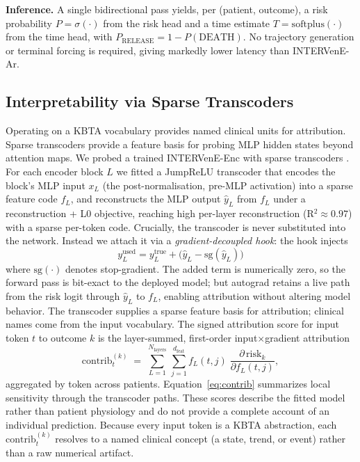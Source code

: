 \documentclass[letterpaper]{article} %
\begin{document}
\textbf{Inference.} A single bidirectional pass yields, per (patient, outcome), a risk probability $P = \sigma(\cdot)$ from the risk head and a time estimate $T = \mathrm{softplus}(\cdot)$ from the time head, with $P_{\text{RELEASE}} = 1 - P(\text{DEATH})$. No trajectory generation or terminal forcing is required, giving markedly lower latency than INTERVenE-Ar.

\subsection{Interpretability via Sparse Transcoders}

Operating on a KBTA vocabulary provides named clinical units for attribution. Sparse transcoders provide a feature basis for probing MLP hidden states beyond attention maps. We probed a trained INTERVenE-Enc with sparse transcoders \citep{dunefsky2024transcoders}. For each encoder block $L$ we fitted a JumpReLU transcoder \citep{rajamanoharan2024jumping} that encodes the block's MLP input $x_L$ (the post-normalisation, pre-MLP activation) into a sparse feature code $f_L$, and reconstructs the MLP output $\hat{y}_L$ from $f_L$ under a reconstruction + L0 objective, reaching high per-layer reconstruction (R$^2\approx 0.97$) with a sparse per-token code. Crucially, the transcoder is never substituted into the network. Instead we attach it via a \emph{gradient-decoupled hook}: the hook injects
\begin{equation}
y^{\mathrm{used}}_L = y^{\mathrm{true}}_L + \big(\hat{y}_L - \mathrm{sg}(\hat{y}_L)\big)
\label{eq:gd-hook}
\end{equation}
where $\mathrm{sg}(\cdot)$ denotes stop-gradient. The added term is numerically zero, so the forward pass is bit-exact to the deployed model; but autograd retains a live path from the risk logit through $\hat{y}_L$ to $f_L$, enabling attribution without altering model behavior. The transcoder supplies a sparse feature basis for attribution; clinical names come from the input vocabulary. The signed attribution score for input token $t$ to outcome $k$ is the layer-summed, first-order input$\times$gradient attribution
\begin{equation}
\mathrm{contrib}_t^{(k)} \;=\; \sum_{L=1}^{N_{\mathrm{layers}}}\,\sum_{j=1}^{d_{\mathrm{feat}}} f_L(t,j)\;\frac{\partial\,\mathrm{risk}_k}{\partial f_L(t,j)},
\label{eq:contrib}
\end{equation}
aggregated by token across patients. Equation~\eqref{eq:contrib} summarizes local sensitivity through the transcoder paths. These scores describe the fitted model rather than patient physiology and do not provide a complete account of an individual prediction. Because every input token is a KBTA abstraction, each $\mathrm{contrib}_t^{(k)}$ resolves to a named clinical concept (a state, trend, or event) rather than a raw numerical artifact.
\end{document}
